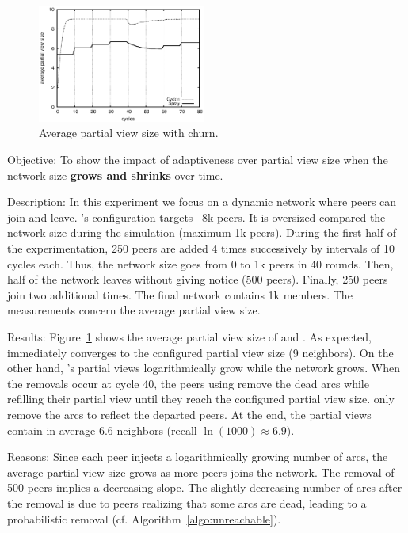 \ \\

\begin{figure}
  \centering
  \includegraphics[width=0.49\textwidth]{img/avgpv.eps}
  \caption{\label{fig:churn}Average partial view size with churn.}
\end{figure}

\begin{asparadesc}
\item[Objective:] To show the impact of adaptiveness over partial view size when
  the network size \textbf{grows and shrinks} over time.
\item[Description:] In this experiment we focus on a dynamic network where peers
  can join and leave.  \CYCLON's configuration targets ~8k peers. It is
  oversized compared the network size during the simulation (maximum 1k
  peers). During the first half of the experimentation, 250 peers are added 4
  times successively by intervals of 10 cycles each. Thus, the network size goes
  from 0 to 1k peers in 40 rounds. Then, half of the network leaves without
  giving notice (500 peers). Finally, 250 peers join two additional times. The
  final network contains 1k members. The measurements concern the average
  partial view size.
\item[Results:] Figure~\ref{fig:churn} shows the average partial view size of
  \SPRAY and \CYCLON. As expected, \CYCLON immediately converges to the
  configured partial view size (9 neighbors). On the other hand, \SPRAY's
  partial views logarithmically grow while the network grows. When the removals
  occur at cycle 40, the peers using \CYCLON remove the dead arcs while
  refilling their partial view until they reach the configured partial view
  size. \SPRAY only remove the arcs to reflect the departed peers. At the end,
  the \SPRAY partial views contain in average 6.6 neighbors (recall
  $\ln(1000)\approx 6.9$).
\item[Reasons:] Since each peer injects a logarithmically growing number of
  arcs, the average partial view size grows as more peers joins the network.
  The removal of 500 peers implies a decreasing slope. The slightly decreasing
  number of arcs after the removal is due to peers realizing that some arcs are
  dead, leading to a probabilistic removal (cf. Algorithm~\ref{algo:unreachable}).
\end{asparadesc}

